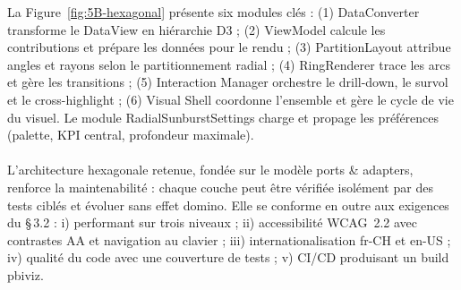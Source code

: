 La Figure~\ref{fig:5B-hexagonal} présente six modules clés : (1) DataConverter transforme le DataView en hiérarchie D3 ; (2) ViewModel calcule les contributions et prépare les données pour le rendu ; (3) PartitionLayout attribue angles et rayons selon le partitionnement radial ; (4) RingRenderer trace les arcs et gère les transitions ; (5) Interaction Manager orchestre le drill-down, le survol et le cross-highlight ; (6) Visual Shell coordonne l’ensemble et gère le cycle de vie du visuel. Le module RadialSunburstSettings charge et propage les préférences (palette, KPI central, profondeur maximale).

\paragraph{} L’architecture hexagonale retenue, fondée sur le modèle ports \& adapters, renforce la maintenabilité : chaque couche peut être vérifiée isolément par des tests ciblés et évoluer sans effet domino. Elle se conforme en outre aux exigences du §\,3.2 : i) performant sur trois niveaux ; ii) accessibilité WCAG~2.2 avec contrastes AA et navigation au clavier ; iii) internationalisation fr-CH et en-US ; iv) qualité du code avec une couverture de tests ; v) CI/CD produisant un build pbiviz.
